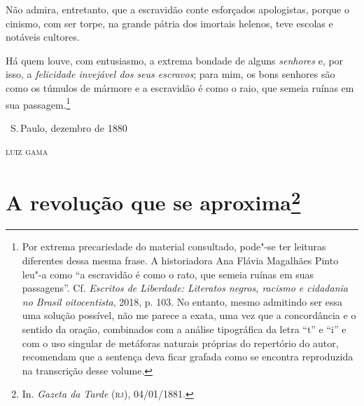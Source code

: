 
Não admira, entretanto, que a escravidão conte esforçados apologistas,
porque o cinismo, com ser torpe, na grande pátria dos imortais helenos,
teve escolas e notáveis cultores.

Há quem louve, com entusiasmo, a extrema bondade de alguns
\emph{senhores} e, por isso, a \emph{felicidade invejável dos seus
escravos}; para mim, os bons senhores são como os túmulos de mármore e a
escravidão é como o raio, que semeia ruínas em sua passagem.\footnote{
  Por extrema precariedade do material consultado, pode"-se ter leituras
  diferentes dessa mesma frase. A historiadora Ana Flávia Magalhães
  Pinto leu"-a como ``a escravidão é como o rato, que semeia ruínas em
  suas passagens''. Cf. \emph{Escritos de Liberdade: Literatos negros,
  racismo e cidadania no Brasil oitocentista}, 2018, p. 103. No entanto,
mesmo admitindo ser essa uma solução possível, não me parece a exata,
uma vez que a concordância e o sentido da oração, combinados com a análise tipográfica da letra ``t'' e
  ``i'' e com o uso singular de metáforas naturais
  próprias do repertório do autor, recomendam que a sentença deva ficar
  grafada como se encontra reproduzida na transcrição desse volume.}

\bigskip

\hfill\ S.\,Paulo, dezembro de 1880\smallskip

\hfill\textsc{luiz gama}

\chapter{A revolução que se aproxima\footnote[*]{In.
  \emph{Gazeta da Tarde} (\textsc{rj}), 04/01/1881.}}


